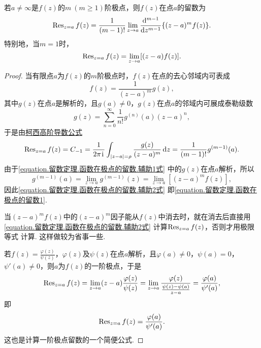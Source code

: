 \begin{property}
若\(a\neq\infty\)是\(f(z)\)的\(m\ (m\geq1)\)阶极点，则\(f(z)\)在点\(a\)的留数为\begin{equation}\label{equation.留数定理.函数在极点的留数1}
\operatorname{Res}_{z=a} f(z)
= \frac{1}{(m-1)!} \lim\limits_{z \to a} \dv[m-1]{z} \{ (z-a)^m f(z) \}.
\end{equation}
特别地，当\(m=1\)时，\begin{equation}\label{equation.留数定理.函数在极点的留数2}
\operatorname{Res}_{z=a} f(z)
= \lim\limits_{z \to a} [(z-a) f(z)].
\end{equation}
\begin{proof}
当有限点\(a\)为\(f(z)\)的\(m\)阶极点时，\(f(z)\)在点的去心邻域内可表成\begin{equation}\label{equation.留数定理.函数在极点的留数.辅助1式}
f(z) = \frac{1}{(z-a)^m} g(z),
\end{equation}
其中\(g(z)\)在点\(a\)是解析的，且\(g(a)\neq0\)，\(g(z)\)在点\(a\)的邻域内可展成泰勒级数\[
g(z) = \sum\limits_{n=0}^\infty \frac{1}{n!} g^{(n)}(a) (z-a)^n,
\]于是由\hyperref[equation:解析函数的积分表示.柯西高阶导数公式]{柯西高阶导数公式}\begin{equation}\label{equation.留数定理.函数在极点的留数.辅助2式}
\operatorname{Res}_{z=a} f(z) = C_{-1}
= \frac{1}{2\pi\kern1pt\mathrm{i}\kern1pt} \int_{\abs{z-a}=\rho} \frac{g(z)}{(z-a)^m} \dd{z}
= \frac{1}{(m-1)!} g^{(m-1)}(a).
\end{equation}由于\cref{equation.留数定理.函数在极点的留数.辅助1式} 中的\(g(z)\)在点\(a\)解析，所以\[
g^{(m-1)}(a) = \lim\limits_{z \to a} g^{(m-1)}(z)
= \lim\limits_{z \to a} [(z-a)^m f(z)],
\]因此\cref{equation.留数定理.函数在极点的留数.辅助2式} 即\cref{equation.留数定理.函数在极点的留数1}.

当\((z-a)^m f(z)\)中的\((z-a)^m\)因子能从\(f(z)\)中消去时，就在消去后直接用\cref{equation.留数定理.函数在极点的留数.辅助2式} 计算\(\operatorname{Res}_{z=a} f(z)\)，否则才用极限等式  计算.
这样做较为省事一些.

若\(f(z) = \frac{\varphi(z)}{\psi(z)}\)，\(\varphi(z)\)及\(\psi(z)\)在点\(a\)解析，且\(\varphi(a)\neq0\)，\(\psi(a)=0\)，\(\psi'(a)\neq0\)，则\(a\)为\(f(z)\)的一阶极点，于是\[
\operatorname{Res}_{z=a} f(z)
= \lim\limits_{z \to a} (z-a) \frac{\varphi(z)}{\psi(z)}
= \lim\limits_{z \to a} \frac{\varphi(z)}{\frac{\psi(z)-\psi(a)}{z-a}}
= \frac{\varphi(a)}{\psi'(a)},
\]即\begin{equation}\label{equation.留数定理.函数在极点的留数3}
\operatorname{Res}_{z=a} f(z)
= \frac{\varphi(a)}{\psi'(a)}.
\end{equation}
这也是计算一阶极点留数的一个简便公式.
\end{proof}
\end{property}

